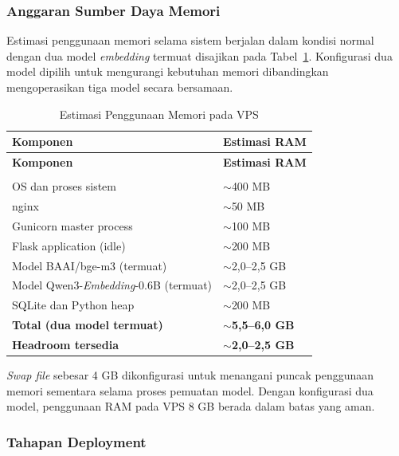 \subsubsection{Anggaran Sumber Daya Memori}\label{anggaran-sumber-daya-memori}

Estimasi penggunaan memori selama sistem berjalan dalam kondisi normal dengan dua model \textit{embedding} termuat disajikan pada Tabel~\ref{table:ram_budget}. Konfigurasi dua model dipilih untuk mengurangi kebutuhan memori dibandingkan mengoperasikan tiga model secara bersamaan.

\begin{longtable}[c]{|p{7cm}|p{5cm}|}

\hline
\textbf{Komponen} & \textbf{Estimasi RAM} \\ \hline
\endfirsthead

\hline
\textbf{Komponen} & \textbf{Estimasi RAM} \\ \hline
\endhead

\hline
\caption{Estimasi Penggunaan Memori pada VPS} \label{table:ram_budget} \\
\endlastfoot

OS dan proses sistem & $\sim$400 MB \\ \hline
nginx & $\sim$50 MB \\ \hline
Gunicorn master process & $\sim$100 MB \\ \hline
Flask application (idle) & $\sim$200 MB \\ \hline
Model BAAI/bge-m3 (termuat) & $\sim$2,0–2,5 GB \\ \hline
Model Qwen3-\textit{Embedding}-0.6B (termuat) & $\sim$2,0–2,5 GB \\ \hline
SQLite dan Python heap & $\sim$200 MB \\ \hline
\textbf{Total (dua model termuat)} & \textbf{$\sim$5,5–6,0 GB} \\ \hline
\textbf{Headroom tersedia} & \textbf{$\sim$2,0–2,5 GB} \\ \hline

\end{longtable}

\textit{Swap file} sebesar 4 GB dikonfigurasi untuk menangani puncak penggunaan memori sementara selama proses pemuatan model. Dengan konfigurasi dua model, penggunaan RAM pada VPS 8 GB berada dalam batas yang aman.

\subsubsection{Tahapan Deployment}\label{tahapan-deployment}

